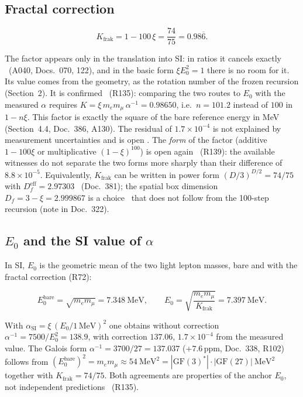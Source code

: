 \subsection{Fractal correction}

\begin{ffkern}
\begin{equation}
  K_{\text{frak}}=1-100\,\xi=\frac{74}{75}=0.98\overline{6}.
\end{equation}
\end{ffkern}%
The factor appears only in the translation into SI: in ratios it cancels exactly \BM\ (A040,
Docs.~070, 122), and in the basic form $\xi E_0^2=1$ there is no room for it. Its value comes from
the geometry, as the rotation number of the frozen recursion (Section~2). It is confirmed \KM\
(R135): comparing the two routes to $E_0$ with the measured $\alpha$ requires
$K=\xi\,m_em_\mu\,\alpha^{-1}=0.98650$, i.e.\ $n=101.2$ instead of $100$ in $1-n\xi$. This factor
is exactly the square of the bare reference energy in MeV (Section~4.4, Doc.~386, A130). The
residual of $1.7\times10^{-4}$ is not explained by measurement uncertainties and is open \SM. The
\emph{form} of the factor (additive $1-100\xi$ or multiplicative $(1-\xi)^{100}$) is open again
\SM\ (R139): the available witnesses do not separate the two forms more sharply than their
difference of $8.8\times10^{-5}$. Equivalently, $K_{\text{frak}}$ can be written in power form
$(D/3)^{D/2}=74/75$ with $D_f^{\text{eff}}=2.97303$ \KM\ (Doc.~381); the spatial box dimension
$D_f=3-\xi=2.999867$ is a choice \SM\ that does not follow from the 100-step recursion (note in
Doc.~322).

\subsection{\texorpdfstring{$E_0$}{E0} and the SI value of \texorpdfstring{$\alpha$}{alpha}}

In SI, $E_0$ is the geometric mean of the two light lepton masses, bare and with the fractal
correction (R72):
\begin{ffkern}
\begin{equation}
  E_0^{\text{bare}}=\sqrt{m_em_\mu}=7.348\ \text{MeV},\qquad
  E_0=\sqrt{\frac{m_em_\mu}{K_{\text{frak}}}}=7.397\ \text{MeV}.
\end{equation}
\end{ffkern}%
With $\alpha_{\text{SI}}=\xi\,(E_0/1\,\text{MeV})^2$ one obtains without correction
$\alpha^{-1}=7500/E_0^2=138.9$, with correction $137.06$, $1.7\times10^{-4}$ from the measured
value. The Galois form $\alpha^{-1}=3700/27=137.037$ ($+7.6$\,ppm, Doc.~338, R102) follows from
$(E_0^{\text{bare}})^2=m_em_\mu\approx54\ \text{MeV}^2=|\mathrm{GF}(3)^*|\cdot|\mathrm{GF}(27)|\ \text{MeV}^2$
together with $K_{\text{frak}}=74/75$. Both agreements are properties of the anchor $E_0$, not
independent predictions \KM\ (R135).

